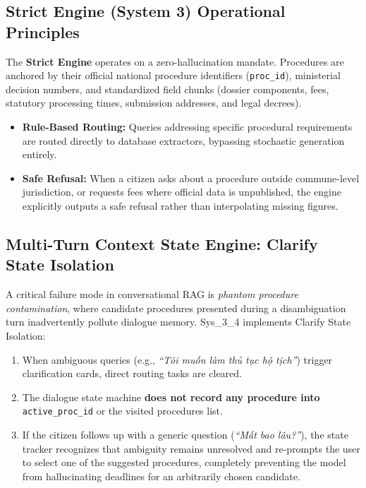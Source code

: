 \documentclass[11pt,a4paper]{article}
\newcommand{\sys}{\mbox{Sys\_3\_4}}
\begin{document}
\subsection{Strict Engine (System 3) Operational Principles}
The \textbf{Strict Engine} operates on a zero-hallucination mandate. Procedures are anchored by their
official national procedure identifiers (\texttt{proc\_id}), ministerial decision numbers, and
standardized field chunks (dossier components, fees, statutory processing times, submission addresses,
and legal decrees).
\begin{itemize}
\item \textbf{Rule-Based Routing:} Queries addressing specific procedural requirements are routed
directly to database extractors, bypassing stochastic generation entirely.
\item \textbf{Safe Refusal:} When a citizen asks about a procedure outside commune-level jurisdiction,
or requests fees where official data is unpublished, the engine explicitly outputs a safe refusal
rather than interpolating missing figures.
\end{itemize}

\subsection{Multi-Turn Context State Engine: Clarify State Isolation}
A critical failure mode in conversational RAG is \emph{phantom procedure contamination}, where candidate
procedures presented during a disambiguation turn inadvertently pollute dialogue memory. \sys{}
implements Clarify State Isolation:
\begin{enumerate}[label=\arabic*.]
\item When ambiguous queries (e.g., \emph{``Tôi muốn làm thủ tục hộ tịch''}) trigger clarification cards,
direct routing tasks are cleared.
\item The dialogue state machine \textbf{does not record any procedure into} \texttt{active\_proc\_id}
or the visited procedures list.
\item If the citizen follows up with a generic question (\emph{``Mất bao lâu?''}), the state tracker
recognizes that ambiguity remains unresolved and re-prompts the user to select one of the suggested
procedures, completely preventing the model from hallucinating deadlines for an arbitrarily chosen
candidate.
\end{enumerate}
\end{document}
